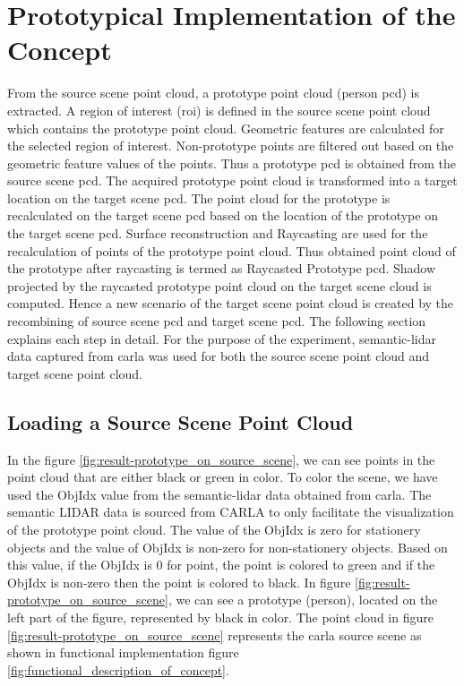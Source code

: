 \chapter{Prototypical Implementation of the Concept}
From the source scene point cloud, a prototype point cloud (person \acrshort{pcd}) is extracted. A region of interest (\acrshort{roi}) is defined in the source scene point cloud which contains the prototype point cloud. Geometric features are calculated for the selected region of interest. Non-prototype points are filtered out based on the geometric feature values of the points. Thus a prototype \acrshort{pcd} is obtained from the source scene \acrshort{pcd}. The acquired prototype point cloud is transformed into a target location on the target scene \acrshort{pcd}. The point cloud for the prototype is recalculated on the target scene \acrshort{pcd} based on the location of the prototype on the target scene \acrshort{pcd}. Surface reconstruction and Raycasting are used for the recalculation of points of the prototype point cloud. Thus obtained point cloud of the prototype after raycasting is termed as Raycasted Prototype \acrshort{pcd}. Shadow projected by the raycasted prototype point cloud on the target scene cloud is computed. Hence a new scenario of the target scene point cloud is created by the recombining of source scene \acrshort{pcd} and target scene \acrshort{pcd}. The following section explains each step in detail. For the purpose of the experiment, semantic-lidar data captured from \acrshort{carla} was used for both the source scene point cloud and target scene point cloud.

\section{Loading a Source Scene Point Cloud}
 In the figure \ref{fig:result-prototype_on_source_scene}, we can see points in the point cloud that are either black or green in color. To color the scene, we have used the ObjIdx value from the semantic-lidar data obtained from \acrshort{carla}. The semantic LIDAR data is sourced from CARLA to only facilitate the visualization of the prototype point cloud. The value of the ObjIdx is zero for stationery objects and the value of ObjIdx is non-zero for non-stationery objects. Based on this value, if the ObjIdx is 0 for point, the point is colored to green and if the ObjIdx is non-zero then the point is colored to black. In figure \ref{fig:result-prototype_on_source_scene}, we can see a prototype (person), located on the left part of the figure, represented by black in color. The point cloud in figure \ref{fig:result-prototype_on_source_scene} represents the \acrshort{carla} source scene as shown in functional implementation figure \ref{fig:functional_description_of_concept}.


